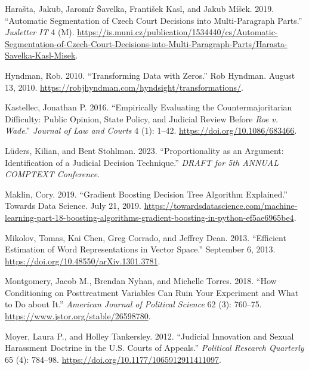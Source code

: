 \documentclass[
  11pt,
]{article}
\newlength{\cslhangindent}
\newenvironment{CSLReferences}[2] %
 {%
  \setlength{\parindent}{0pt}
  \ifodd #1 \everypar{\setlength{\hangindent}{\cslhangindent}}\ignorespaces\fi
  \ifnum #2 > 0
  \setlength{\parskip}{#2\baselineskip}
  \fi
 }%
 {}
\begin{document}
\begin{CSLReferences}{1}{0}
\leavevmode{}%
Harašta, Jakub, Jaromír Šavelka, František Kasl, and Jakub Míšek. 2019.
{``Automatic {Segmentation} of {Czech Court Decisions} into
{Multi-Paragraph Parts}.''} \emph{Jusletter IT} 4 (M).
\url{https://is.muni.cz/publication/1534440/cs/Automatic-Segmentation-of-Czech-Court-Decisions-into-Multi-Paragraph-Parts/Harasta-Savelka-Kasl-Misek}.

\leavevmode{}%
Hyndman, Rob. 2010. {``Transforming Data with Zeros.''} {Rob Hyndman}.
August 13, 2010.
\url{https://robjhyndman.com/hyndsight/transformations/}.

\leavevmode{}%
Kastellec, Jonathan P. 2016. {``Empirically {Evaluating} the
{Countermajoritarian Difficulty}: {Public Opinion}, {State Policy}, and
{Judicial Review} Before {\emph{Roe}}{ \emph{v.} }{\emph{Wade}}.''}
\emph{Journal of Law and Courts} 4 (1): 1--42.
\url{https://doi.org/10.1086/683466}.

\leavevmode{}%
Lüders, Kilian, and Bent Stohlman. 2023. {``Proportionality as an
Argument: {Identification} of a Judicial Decision Technique.''}
\emph{DRAFT for 5th ANNUAL COMPTEXT Conference}.

\leavevmode{}%
Maklin, Cory. 2019. {``Gradient {Boosting Decision Tree Algorithm
Explained}.''} {Towards Data Science}. July 21, 2019.
\url{https://towardsdatascience.com/machine-learning-part-18-boosting-algorithms-gradient-boosting-in-python-ef5ae6965be4}.

\leavevmode{}%
Mikolov, Tomas, Kai Chen, Greg Corrado, and Jeffrey Dean. 2013.
{``Efficient {Estimation} of {Word Representations} in {Vector
Space}.''} September 6, 2013.
\url{https://doi.org/10.48550/arXiv.1301.3781}.

\leavevmode{}%
Montgomery, Jacob M., Brendan Nyhan, and Michelle Torres. 2018. {``How
{Conditioning} on {Posttreatment Variables Can Ruin Your Experiment} and
{What} to {Do} about {It}.''} \emph{American Journal of Political
Science} 62 (3): 760--75. \url{https://www.jstor.org/stable/26598780}.

\leavevmode{}%
Moyer, Laura P., and Holley Tankersley. 2012. {``Judicial {Innovation}
and {Sexual Harassment Doctrine} in the {U}.{S}. {Courts} of
{Appeals}.''} \emph{Political Research Quarterly} 65 (4): 784--98.
\url{https://doi.org/10.1177/1065912911411097}.


\end{CSLReferences}
\end{document}
